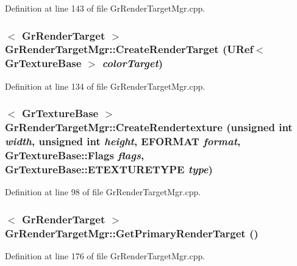 \begin{CompactItemize}
Definition at line 143 of file GrRenderTargetMgr.cpp.\hypertarget{class_gr_render_target_mgr_2dc9cb29f5f88c355eaab0938c0f355d}{
\subsubsection[{CreateRenderTarget}]{$<$ {\bf GrRenderTarget} $>$ GrRenderTargetMgr::CreateRenderTarget ({\bf URef}$<$ {\bf GrTextureBase} $>$ {\em colorTarget})}}
\label{class_gr_render_target_mgr_2dc9cb29f5f88c355eaab0938c0f355d}




Definition at line 134 of file GrRenderTargetMgr.cpp.\hypertarget{class_gr_render_target_mgr_7e1d7957a2167cd17b678a44da653898}{
\subsubsection[{CreateRendertexture}]{$<$ {\bf GrTextureBase} $>$ GrRenderTargetMgr::CreateRendertexture (unsigned int {\em width}, \/  unsigned int {\em height}, \/  {\bf EFORMAT} {\em format}, \/  {\bf GrTextureBase::Flags} {\em flags}, \/  {\bf GrTextureBase::ETEXTURETYPE} {\em type})}}
\label{class_gr_render_target_mgr_7e1d7957a2167cd17b678a44da653898}




Definition at line 98 of file GrRenderTargetMgr.cpp.\hypertarget{class_gr_render_target_mgr_b48e6f9a057059671a40a6a6e09946b4}{
\subsubsection[{GetPrimaryRenderTarget}]{$<$ {\bf GrRenderTarget} $>$ GrRenderTargetMgr::GetPrimaryRenderTarget ()}}
\label{class_gr_render_target_mgr_b48e6f9a057059671a40a6a6e09946b4}




Definition at line 176 of file GrRenderTargetMgr.cpp.\hypertarget{class_gr_render_target_mgr_9a98afe30d4cf8ed4387f491fa0c00a3}{
}
\end{CompactItemize}
